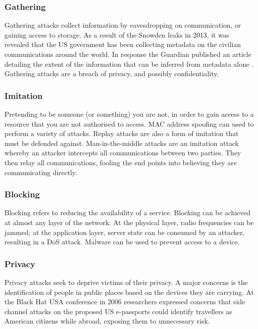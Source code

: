 \documentclass[10pt,journal,compsoc]{IEEEtran}
\begin{document}
\subsubsection{Gathering}
Gathering attacks collect information by eavesdropping on communication, or
gaining access to storage. As a result of the Snowden leaks in 2013, it was
revealed that the US government has been collecting metadata on the civilian
communications around the world. In response the Guardian published an article
detailing the extent of the information that can be inferred from metadata
alone \cite{Guardian2013}. Gathering attacks are a breach of privacy, and
possibly confidentiality. 

\subsubsection{Imitation}
Pretending to be someone (or something) you are not, in order to gain access to
a resource that you are not authorised to access. MAC address spoofing can used
to perform a variety of attacks. Replay attacks are also a form of imitation
that must be defended against. Man-in-the-middle attacks are an imitation
attack whereby an attacker intercepts all communications between two parties.
They then relay all communications, fooling the end points into believing they
are communicating directly. 

\subsubsection{Blocking}
Blocking refers to reducing the availability of a service. Blocking can be
achieved at almost any layer of the network. At the physical layer, radio
frequencies can be jammed; at the application layer, server state can be
consumed by an attacker, resulting in a DoS attack. Malware can be used to
prevent access to a device.

\subsubsection{Privacy}
Privacy attacks seek to deprive victims of their privacy. A major concerns is
the identification of people in public places based on the devices they are
carrying. At the Black Hat USA conference in 2006 \cite{Flexilis2006}
researchers expressed concerns that side channel attacks on the proposed US
e-passports could identify travellers as American citizens while abroad,
exposing them to unnecessary risk.
\end{document}
